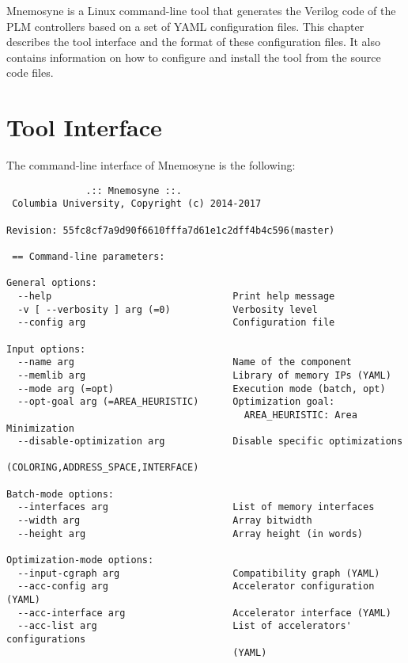 
{\sc Mnemosyne} is a Linux command-line tool that generates the
Verilog code of the PLM controllers based on a set of YAML
configuration files. This chapter describes the tool interface and the
format of these configuration files. It also contains information on
how to configure and install the tool from the source code files.

\section{Tool Interface}

The command-line interface of {\sc Mnemosyne} is the following:

\begin{verbatim}
              .:: Mnemosyne ::.
 Columbia University, Copyright (c) 2014-2017

Revision: 55fc8cf7a9d90f6610fffa7d61e1c2dff4b4c596(master)

 == Command-line parameters:

General options:
  --help                                Print help message
  -v [ --verbosity ] arg (=0)           Verbosity level
  --config arg                          Configuration file

Input options:
  --name arg                            Name of the component
  --memlib arg                          Library of memory IPs (YAML)
  --mode arg (=opt)                     Execution mode (batch, opt)
  --opt-goal arg (=AREA_HEURISTIC)      Optimization goal:
                                          AREA_HEURISTIC: Area Minimization
  --disable-optimization arg            Disable specific optimizations
                                        (COLORING,ADDRESS_SPACE,INTERFACE)

Batch-mode options:
  --interfaces arg                      List of memory interfaces
  --width arg                           Array bitwidth
  --height arg                          Array height (in words)

Optimization-mode options:
  --input-cgraph arg                    Compatibility graph (YAML)
  --acc-config arg                      Accelerator configuration (YAML)
  --acc-interface arg                   Accelerator interface (YAML)
  --acc-list arg                        List of accelerators' configurations
                                        (YAML)


\end{verbatim}
